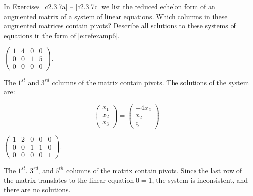 \documentclass{ximera}
\begin{document}
\noindent In Exercises~\ref{c2.3.7a} -- \ref{c2.3.7c} we list
the reduced echelon form of an augmented matrix of a system of
linear equations.  Which columns in these augmented matrices
contain pivots?  Describe all solutions to these systems of
equations in the form of \eqref{e:refexamp6}.

\begin{exercise} \label{c2.3.7a}
$\left(\begin{array}{rrr|r}
 1  &  4 & 0 & 0\\
 0  &  0 & 1 & 5\\
 0  &  0 & 0 & 0
       \end{array}\right)$.

\begin{solution}
\ans The $1^{st}$ and $3^{rd}$ columns of the matrix contain
pivots.  The solutions of the system are:

\[
\left(\begin{array}{r} x_1 \\ x_2 \\ x_3\end{array} \right)
= \left(\begin{array}{c} -4x_2 \\ x_2 \\ 5\end{array} \right)
\]

\end{solution}
\end{exercise}

\begin{exercise} \label{c2.3.7b}
$\left(\begin{array}{rrrr|r}
 1  &  2 & 0 & 0 & 0\\
 0  &  0 & 1 & 1 & 0\\
 0  &  0 & 0 & 0 & 1
       \end{array}\right)$.

\begin{solution}
\ans The $1^{st}$, $3^{rd}$, and $5^{th}$ columns of the matrix
contain pivots.  Since the last row of the matrix translates to the linear
equation $0 = 1$, the system is inconsistent, and there are no solutions.

\end{solution}
\end{exercise}
\end{document}
